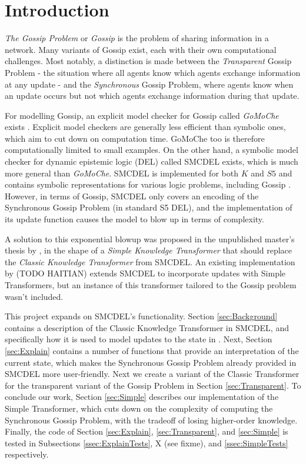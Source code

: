 \section{Introduction}

\textit{The Gossip Problem} or \textit{Gossip} is the problem of sharing information in a network. 
Many variants of Gossip exist, each with their own computational challenges. 
Most notably, a distinction is made between the \textit{Transparent} Gossip Problem - the situation where all agents know 
which agents exchange information at any update - and the \textit{Synchronous} Gossip Problem, where agents know when an 
update occurs but not which agents exchange information during that update.

For modelling Gossip, an explicit model checker for Gossip called \textit{GoMoChe} exists \cite{gattinger2023gomoche}. 
Explicit model checkers are generally less efficient than symbolic ones, which aim to cut down on computation time. 
GoMoChe too is therefore computationally limited to small examples. On the other hand, 
a symbolic model checker for dynamic epistemic logic (DEL) called SMCDEL exists, which is much more general than \textit{GoMoChe}. 
SMCDEL is implemented for
both $K$ and $S5$ and contains symbolic representations for various logic problems, including Gossip \cite{GattingerThesis2018}. 
However, in terms of Gossip, SMCDEL only covers an encoding of the Synchronous Gossip 
Problem (in standard S5 DEL), and the implementation of its update function causes the model to blow up in terms of 
complexity.

A solution to this exponential blowup was proposed in the unpublished master's thesis by \cite{danielMasterThesis}, in the shape 
of a \textit{Simple Knowledge Transformer} that should replace the \textit{Classic Knowledge Transformer} from SMCDEL. An existing 
implementation by (TODO HAITIAN) extends SMCDEL to incorporate updates with Simple Transformers, but an instance of this transformer
tailored to the Gossip problem wasn't included. 

This project expands on SMCDEL's functionality. Section \ref{sec:Background} contains a description of 
the Classic Knowledge Transformer in SMCDEL, and 
specifically how it is used to model updates to the state in \cite{GattingerThesis2018}. 
Next, Section \ref{sec:Explain} contains a number of functions that provide an interpretation of the current state, 
which makes the Synchronous Gossip Problem already provided in SMCDEL more user-friendly. 
Next we create a variant of the Classic Transformer for the transparent variant of the Gossip Problem in Section \ref{sec:Transparent}. 
To conclude our work, Section \ref{sec:Simple} describes our implementation of the Simple Transformer, 
which cuts down on the complexity of computing the Synchronous Gossip Problem, with the tradeoff of losing higher-order knowledge. 
Finally, the code of Section \ref{sec:Explain}, \ref{sec:Transparent}, and \ref{sec:Simple} is tested in Subsections \ref{ssec:ExplainTests}, 
X (see fixme), and \ref{ssec:SimpleTests} respectively.


